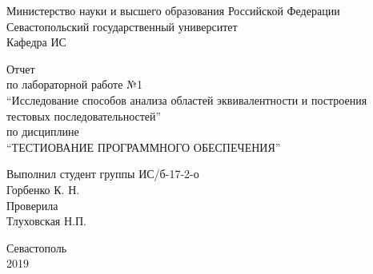 \documentclass[a4paper,14pt]{extarticle}
\newcommand{\mylabnumber}{1}
\newcommand{\mylabtitle}{Исследование способов анализа областей эквивалентности
    и построения тестовых последовательностей}
\newcommand{\mysubject}{Тестиование программного обеспечения}
\newcommand{\mylecturer}{Тлуховская Н.П.}
\begin{document}
    \lstset{ %
        basicstyle=\footnotesize\ttfamily,
        breaklines=true,
        numbersep=5pt,
        tabsize=4,
        gobble=8,
        extendedchars=\true,
        keepspaces=\true,
        numbers=left,
        stringstyle=\ttfamily,
        showstringspaces=\false
    }


    \begin{titlepage}
        
        \thispagestyle{empty}
        
        \begin{center}
            
            Министерство науки и высшего образования Российской Федерации \\
            Севастопольский государственный университет \\
            Кафедра ИС
            
            \vfill

            Отчет \\
            по лабораторной работе №\mylabnumber \\
            \enquote{\mylabtitle} \\
            по дисциплине \\
            \enquote{\MakeTextUppercase{\mysubject}}

        \end{center}

        \vspace{1cm}

        \noindent\hspace{7.5cm} Выполнил студент группы ИС/б-17-2-о \\
        \null\hspace{7.5cm} Горбенко К. Н. \\
        \null\hspace{7.5cm} Проверила \\
        \null\hspace{7.5cm} \mylecturer

        \vfill

        \begin{center}
            Севастополь \\
            2019
        \end{center}

    \end{titlepage}
\end{document}
